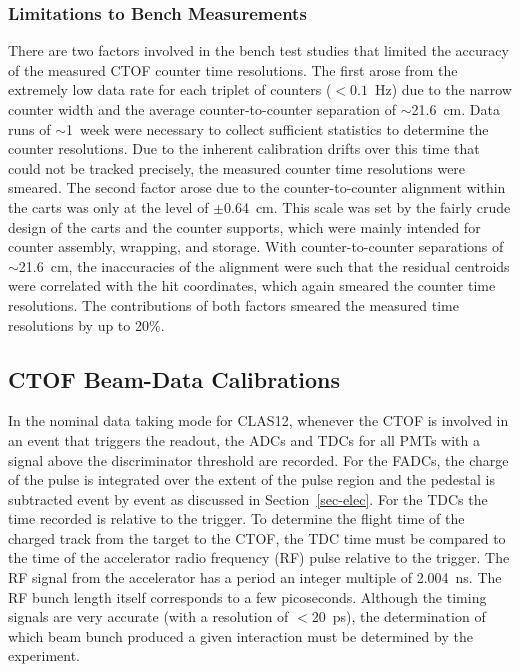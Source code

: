 \documentclass{elsart}
\begin{document}
\subsubsection{Limitations to Bench Measurements}
\label{res-limitations}

There are two factors involved in the bench test studies that limited the accuracy of the measured
CTOF counter time resolutions. The first arose from the extremely low data rate for each triplet 
of counters ($< 0.1$~Hz) due to the narrow counter width and the average counter-to-counter
separation of $\sim$21.6~cm. Data runs of $\sim$1~week were necessary to collect sufficient
statistics to determine the counter resolutions. Due to the inherent calibration drifts over this time
that  could not be tracked precisely, the measured counter time resolutions were smeared. The
second factor arose due to the counter-to-counter alignment within the carts was only at the level of
$\pm$0.64~cm. This scale was set by the fairly crude design of the carts and the counter supports,
which were mainly intended for counter assembly, wrapping, and storage. With counter-to-counter
separations of $\sim$21.6~cm, the inaccuracies of the alignment were such that the residual centroids
were correlated with the hit coordinates, which again smeared the counter time resolutions. The
contributions of both factors smeared the measured time resolutions by up to 20\%. 

\subsection{CTOF Beam-Data Calibrations}

In the nominal data taking mode for CLAS12, whenever the CTOF is involved in an event that triggers
the readout, the ADCs and TDCs for all PMTs with a signal above the discriminator threshold are
recorded. For the FADCs, the charge of the pulse is integrated over the extent of the pulse region
and the pedestal is subtracted event by event as discussed in Section~\ref{sec-elec}. For the TDCs
the time recorded is relative to the trigger. To determine the flight time of the charged track from
the target to the CTOF, the TDC time must be compared to the time of the accelerator radio frequency
(RF) pulse relative to the trigger. The RF signal from the accelerator has a period an integer multiple of
2.004~ns. The RF bunch length itself corresponds to a few picoseconds. Although the timing signals are
very accurate (with a resolution of $<$20~ps), the determination of which beam bunch produced a given
interaction must be determined by the experiment.
\end{document}
